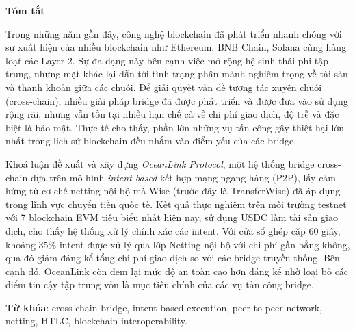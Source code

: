 \begin{center}
\textbf{\large{Tóm tắt}	}
\end{center}


\begin{small}

Trong những năm gần đây, công nghệ blockchain đã phát triển nhanh chóng với sự xuất hiện của nhiều blockchain như Ethereum, BNB Chain, Solana 
cùng hàng loạt các Layer 2. Sự đa dạng này bên cạnh việc mở
rộng hệ sinh thái phi tập trung, nhưng mặt khác lại dẫn tới 
tình trạng phân mảnh nghiêm trọng về tài sản và thanh khoản 
giữa các chuỗi. Để giải quyết vấn đề tương tác xuyên chuỗi 
(cross-chain), nhiều giải pháp bridge đã được 
phát triển và được đưa vào sử dụng rộng rãi, 
nhưng vẫn tồn tại nhiều hạn chế cả về chi phí giao dịch, độ trễ và đặc biệt là bảo mật. Thực tế cho thấy, phần lớn những vụ tấn công gây thiệt hại lớn nhất trong lịch sử blockchain đều nhắm vào điểm yếu của các bridge.

Khoá luận đề xuất và xây dựng \textit{OceanLink Protocol}, 
một hệ thống bridge cross-chain dựa trên mô hình 
\textit{intent-based} kết hợp mạng ngang hàng (P2P), lấy 
cảm hứng từ cơ chế netting nội bộ mà Wise 
(trước đây là TransferWise) đã áp dụng trong 
lĩnh vực chuyển tiền quốc tế. 
Kết quả thực nghiệm trên môi trường testnet với 7 blockchain EVM
tiêu biểu nhất hiện nay, sử dụng USDC làm tài sản giao dịch,
cho thấy hệ thống xử lý chính xác các intent. 
Với cửa sổ ghép cặp 60 giây, khoảng 35\% intent được xử lý
qua lớp Netting nội bộ với chi phí gần bằng không, qua đó
giảm đáng kể tổng chi phí giao dịch so với các bridge truyền thống. 
Bên cạnh đó, OceanLink còn đem lại mức độ an toàn cao hơn đáng kể nhờ loại bỏ các điểm tin cậy tập trung vốn là mục tiêu chính của các vụ tấn công bridge.

\vspace*{1cm}
\textbf{Từ khóa}: cross-chain bridge, intent-based execution, peer-to-peer network, netting, HTLC, blockchain interoperability.

\end{small}
